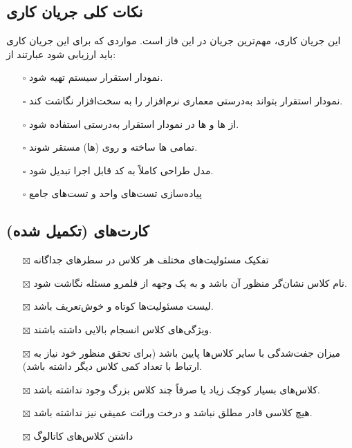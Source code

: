 \subsection{\hspace*{0.2cm}نکات کلی جریان کاری }
این جریان کاری، مهم‌ترین جریان در این فاز است. مواردی که برای این جریان کاری باید ارزیابی شود عبارتند از:
\begin{itemize} \setlength\itemsep{0cm}
	\item[$\square$]
	نمودار استقرار سیستم تهیه شود.
	\item[$\square$]
	نمودار استقرار بتواند به‌درستی معماری نرم‌افزار را به سخت‌افزار نگاشت کند.
	\item[$\square$]
	از  ها و  ها در نمودار استقرار به‌درستی استفاده شود.
	\item[$\square$]
	تمامی  ها ساخته و روی  (ها) مستقر شوند.
	\item[$\square$]
	مدل طراحی کاملاً به کد قابل اجرا تبدیل شود.
	\item[$\square$]
	پیاده‌سازی تست‌های واحد و تست‌های جامع

\end{itemize}

\subsection{\hspace*{0.2cm}کارت‌های  (تکمیل شده)}

\begin{itemize} \setlength\itemsep{0cm}
	\item[$\boxtimes$]
	تفکیک مسئولیت‌های مختلف هر کلاس در سطرهای جداگانه
	\item[$\boxtimes$]
	نام کلاس نشان‌گر منظور آن باشد و به یک وجهه از قلمرو مسئله نگاشت شود.
	\item[$\boxtimes$]
	لیست مسئولیت‌ها کوتاه و خوش‌تعریف باشد.
	\item[$\boxtimes$]
	ویژگی‌های کلاس انسجام بالایی داشته باشند.
	\item[$\boxtimes$]
	میزان جفت‌شدگی با سایر کلاس‌ها پایین باشد (برای تحقق منظور خود نیاز به ارتباط با تعداد کمی کلاس دیگر داشته باشد).
	\item[$\boxtimes$]
	کلاس‌های بسیار کوچک زیاد یا صرفاً چند کلاس بزرگ وجود نداشته باشد.
	\item[$\boxtimes$]
	هیچ کلاسی قادر مطلق نباشد و درخت وراثت عمیقی نیز نداشته باشد.
	\item[$\boxtimes$]
	داشتن کلاس‌های کاتالوگ
\end{itemize}

